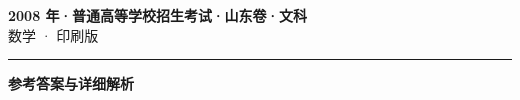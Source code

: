 \documentclass[zihao=5, a4paper]{ctexart}
\begin{document}
\begin{center}
  {\Large\bfseries 2008 年·普通高等学校招生考试·山东卷·文科}\\[4pt]
  {\large 数学 · 印刷版}
\end{center}
\medskip
{}

\par\bigskip\hrule\bigskip
{}
\begin{center}{\large\bfseries 参考答案与详细解析}\end{center}
\smallskip

\end{document}
